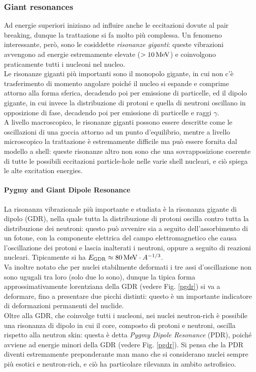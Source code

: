 \subsubsection{Giant resonances}
\label{sub-giant-res}

Ad energie superiori iniziano ad influire anche le eccitazioni dovute al pair breaking, dunque la trattazione si fa molto più complessa. Un fenomeno interessante, però, sono le cosiddette \textit{risonanze giganti}: queste vibrazioni avvengono ad energie estremamente elevate ($ > 10\,\mathrm{MeV} $) e coinvolgono praticamente tutti i nucleoni nel nucleo.\\
Le risonanze giganti più importanti sono il monopolo gigante, in cui non c'è trasferimento di momento angolare poiché il nucleo si espande e comprime attorno alla forma sferica, decadendo poi per emissione di particelle, ed il dipolo gigante, in cui invece la distribuzione di protoni e quella di neutroni oscillano in opposizione di fase, decadendo poi per emissione di particelle e raggi $ \gamma $.\\
A livello macroscopico, le risonanze giganti possono essere descritte come le oscillazioni di una goccia attorno ad un punto d'equilibrio, mentre a livello microscopico la trattazione è estremamente difficile ma può essere fornita dal modello a shell: queste risonanze altro non sono che una sovrapposizione coerente di tutte le possibili eccitazioni particle-hole nelle varie shell nucleari, e ciò spiega le alte excitation energies.

\paragraph{Pygmy and Giant Dipole Resonance}

La risonanza vibrazionale più importante e studiata è la risonanza gigante di dipolo (GDR), nella quale tutta la distribuzione di protoni oscilla contro tutta la distribuzione dei neutroni: questo può avvenire sia a seguito dell'assorbimento di un fotone, con la componente elettrica del campo elettromagnetico che causa l'oscillazione dei protoni e lascia inalterati i neutroni, oppure a seguito di reazioni nucleari. Tipicamente si ha $ E_{\text{GDR}} \approx 80\,\mathrm{MeV} \cdot A^{-1/3} $.\\
Va inoltre notato che per nuclei stabilmente deformati i tre assi d'oscillazione non sono ugugali tra loro (solo due lo sono), dunque la tipica forma approssimativamente lorentziana della GDR (vedere Fig. \ref{pgdr}) si va a deformare, fino a presentare due picchi distinti: questo è un importante indicatore di deformazioni permanenti del nuclide.\\
Oltre alla GDR, che coinvolge tutti i nucleoni, nei nuclei neutron-rich è possibile una risonanza di dipolo in cui il core, composto di protoni e neutroni, oscilla rispetto alla neutron skin: questa è detta \textit{Pygmy Dipole Resonance} (PDR), poiché avviene ad energie minori della GDR (vedere Fig. \ref{pgdr}). Si pensa che la PDR diventi estremamente preponderante man mano che si considerano nuclei sempre più esotici e neutron-rich, e ciò ha particolare rilevanza in ambito astrofisico.

